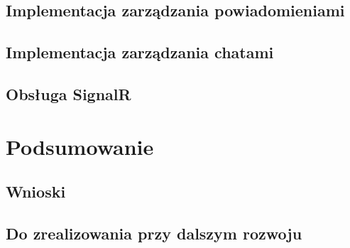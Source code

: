 \documentclass[10pt,a4paper]{article}
\begin{document}
\subsection{Implementacja zarządzania powiadomieniami}
\subsection{Implementacja zarządzania chatami}
\subsection{Obsługa SignalR}

\section{Podsumowanie}

\subsection{Wnioski}
\subsection{Do zrealizowania przy dalszym rozwoju}
\end{document}
